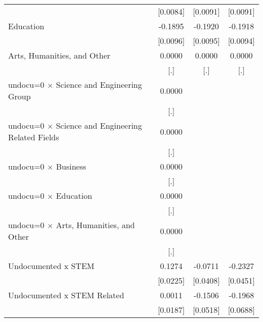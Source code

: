 \begin{table}[htbp]
\begin{tabular}{l*{3}{c}}
                    &    [0.0084]         &    [0.0091]         &    [0.0091]         \\
\addlinespace
Education           &     -0.1895\sym{***}&     -0.1920\sym{***}&     -0.1918\sym{***}\\
                    &    [0.0096]         &    [0.0095]         &    [0.0094]         \\
\addlinespace
Arts, Humanities, and Other&      0.0000         &      0.0000         &      0.0000         \\
                    &         [.]         &         [.]         &         [.]         \\
\addlinespace
undocu=0 $\times$ Science and Engineering Group&      0.0000         &                     &                     \\
                    &         [.]         &                     &                     \\
\addlinespace
undocu=0 $\times$ Science and Engineering Related Fields&      0.0000         &                     &                     \\
                    &         [.]         &                     &                     \\
\addlinespace
undocu=0 $\times$ Business&      0.0000         &                     &                     \\
                    &         [.]         &                     &                     \\
\addlinespace
undocu=0 $\times$ Education&      0.0000         &                     &                     \\
                    &         [.]         &                     &                     \\
\addlinespace
undocu=0 $\times$ Arts, Humanities, and Other&      0.0000         &                     &                     \\
                    &         [.]         &                     &                     \\
\addlinespace
Undocumented x STEM &      0.1274\sym{***}&     -0.0711\sym{*}  &     -0.2327\sym{***}\\
                    &    [0.0225]         &    [0.0408]         &    [0.0451]         \\
\addlinespace
Undocumented x STEM Related&      0.0011         &     -0.1506\sym{***}&     -0.1968\sym{***}\\
                    &    [0.0187]         &    [0.0518]         &    [0.0688]         \\

\end{tabular}
\end{table}
